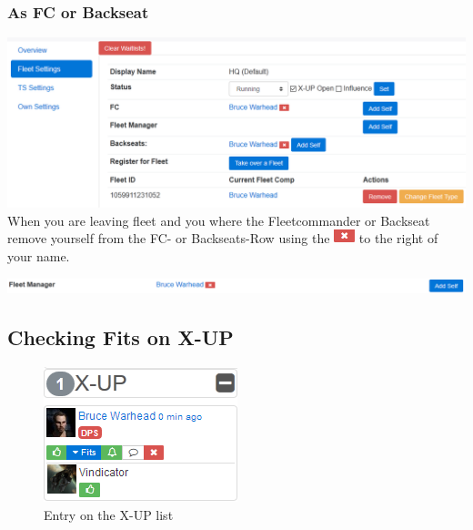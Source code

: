 \documentclass[oneside,a4paper]{article}
\newcommand{\piccross}{\includegraphics{cross.png}\xspace}
\begin{document}
\subsubsection{As FC or Backseat}
\includegraphics[width=\textwidth]{leaving-backseat.png}
When you are leaving fleet and you where the Fleetcommander or Backseat remove yourself from the FC- or Backseats-Row using the \piccross to the right of your name.


\includegraphics[width=\textwidth]{manual-fleet-manager.png}

\subsection{Checking Fits on X-UP}
\begin{figure}[H]
	\centering
	\caption{Entry on the X-UP list}
	\label{pic:xup-entry}
	\includegraphics[]{xup-list.png}
\end{figure}
\end{document}
